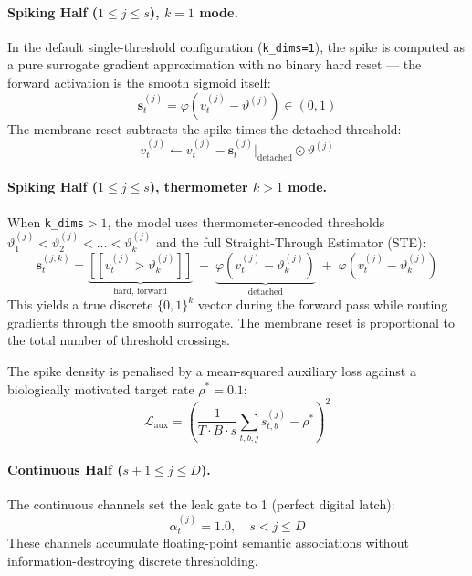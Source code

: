 \documentclass[11pt]{article}
\begin{document}
\paragraph{Spiking Half ($1 \leq j \leq s$), $k=1$ mode.}
In the default single-threshold configuration (\texttt{k\_dims=1}), the spike is computed as a pure surrogate gradient approximation with no binary hard reset — the forward activation is the smooth sigmoid itself:
\begin{equation}
    \mathbf{s}^{(j)}_t = \varphi\!\left(v^{(j)}_t - \vartheta^{(j)}\right) \in (0, 1)
\end{equation}
The membrane reset subtracts the spike times the detached threshold:
\begin{equation}
    v^{(j)}_t \leftarrow v^{(j)}_t - \mathbf{s}^{(j)}_t \big|_{\mathrm{detached}} \odot \vartheta^{(j)}
\end{equation}

\paragraph{Spiking Half ($1 \leq j \leq s$), thermometer $k>1$ mode.}
When \texttt{k\_dims}$>1$, the model uses thermometer-encoded thresholds $\vartheta^{(j)}_1 < \vartheta^{(j)}_2 < \dots < \vartheta^{(j)}_k$ and the full Straight-Through Estimator (STE):
\begin{equation}
    \mathbf{s}^{(j,k)}_t = \underbrace{\left[\!\left[ v^{(j)}_t > \vartheta^{(j)}_k \right]\!\right]}_{\text{hard, forward}} \;-\; \underbrace{\varphi\!\left(v^{(j)}_t - \vartheta^{(j)}_k\right)}_{\text{detached}}\; + \;\varphi\!\left(v^{(j)}_t - \vartheta^{(j)}_k\right)
\end{equation}
This yields a true discrete $\{0,1\}^k$ vector during the forward pass while routing gradients through the smooth surrogate. The membrane reset is proportional to the total number of threshold crossings.

The spike density is penalised by a mean-squared auxiliary loss against a biologically motivated target rate $\rho^* = 0.1$:
\begin{equation}
    \mathcal{L}_{\mathrm{aux}} = \left( \frac{1}{T \cdot B \cdot s} \sum_{t,b,j} s^{(j)}_{t,b} - \rho^* \right)^2
\end{equation}

\paragraph{Continuous Half ($s+1 \leq j \leq D$).}
The continuous channels set the leak gate to 1 (perfect digital latch):
\begin{equation}
    \alpha^{(j)}_t = 1.0, \quad s < j \leq D
\end{equation}
These channels accumulate floating-point semantic associations without information-destroying discrete thresholding.
\end{document}

